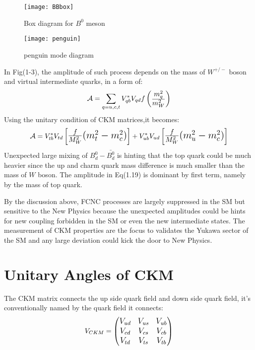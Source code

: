 \begin{figure}[H]
	\begin{minipage}[t]{0.5\linewidth} %
		\centering 
		\texttt{[image: BBbox]} 
		\caption{Box diagram for $B^0$ meson} 
		\label{fig:side:a} 
	\end{minipage}%
	\begin{minipage}[t]{0.5\linewidth} 
		\centering 
		\texttt{[image: penguin]} 
		\caption{penguin mode diagram} 
		\label{fig:side:b} 
	\end{minipage} 
\end{figure}
In Fig(1-3), the amplitude of such process depends on the mass of $W^{+/-}$ boson and  virtual intermediate quarks, in a form of:
\begin{equation}
\Large
\mathcal{A}=
\sum_{q=u,c,t}^{}
V_{qb}^{*}V_{qd} f
\begin{pmatrix}
\frac{m^2_q}{m^2_W}
\end{pmatrix}
\end{equation}
Using the unitary condition of CKM matrices,it becomes: 
\begin{equation}
\Large
\mathcal{A}=
V^*_{tb}V_{td}
\begin{bmatrix}
\frac{f}{M_W^2}
(m^2_t-m^2_c)
\end{bmatrix}
+
V^*_{ub}V_{ud}
\begin{bmatrix}
\frac{f}{M_W^2}
(m^2_u-m^2_c)
\end{bmatrix}
\end{equation}
Unexpected large mixing of $B^0_d-\bar{B^0_d}$ is hinting that the top quark could be much heavier since the up and charm quark mass difference is much smaller than the mass of $W$ boson. The amplitude in Eq(1.19) is dominant by first term, namely by the mass of top quark. 

By the discussion above, FCNC processes are largely suppressed in the SM but sensitive to the  New Physics because the unexpected amplitudes could be hints for new coupling forbidden in the SM or even the new intermediate states. The measurement of CKM  properties are the focus to validates the Yukawa sector of the SM and any large deviation could kick the door to New Physics.  

\section{Unitary Angles of CKM}
The CKM matrix connects the up side quark field and down side quark field, it's conventionally named by the quark field it connects:
\begin{equation}
\large
V_{CKM}=
\begin{pmatrix}
V_{ud} & V_{us} & V_{ub}\\
V_{cd} & V_{cs} & V_{cb}\\
V_{td} & V_{ts} & V_{tb}\\
\end{pmatrix}
\end{equation}

